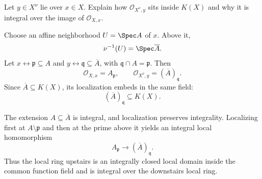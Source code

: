 \begin{problem}\label{prob:vi28-08}
Let \(y\in X^\nu\) lie over \(x\in X\). Explain how \(\mathcal O_{X^\nu,y}\) sits inside \(K(X)\) and why it is integral over the image of \(\mathcal O_{X,x}\).

\end{problem}

\ifdefined\FullProblemDossiers
\begin{solution}
Choose an affine neighborhood \(U=\Spec A\) of \(x\). Above it,
\[
\nu^{-1}(U)=\Spec\overline A.
\]
Let \(x\leftrightarrow\mathfrak p\subseteq A\) and
\(y\leftrightarrow\mathfrak q\subseteq\overline A\), with
\(\mathfrak q\cap A=\mathfrak p\). Then
\[
\mathcal O_{X,x}=A_{\mathfrak p},
\qquad
\mathcal O_{X^\nu,y}=(\overline A)_{\mathfrak q}.
\]
Since \(\overline A\subseteq K(X)\), its localization embeds in the same field:
\[
(\overline A)_{\mathfrak q}\subseteq K(X).
\]

The extension \(A\subseteq\overline A\) is integral, and localization preserves integrality. Localizing first at \(A\setminus\mathfrak p\) and then at the prime above it yields an integral local homomorphism
\[
A_{\mathfrak p}\to(\overline A)_{\mathfrak q}.
\]
Thus the local ring upstairs is an integrally closed local domain inside the common function field and is integral over the downstairs local ring.
\end{solution}
\fi
